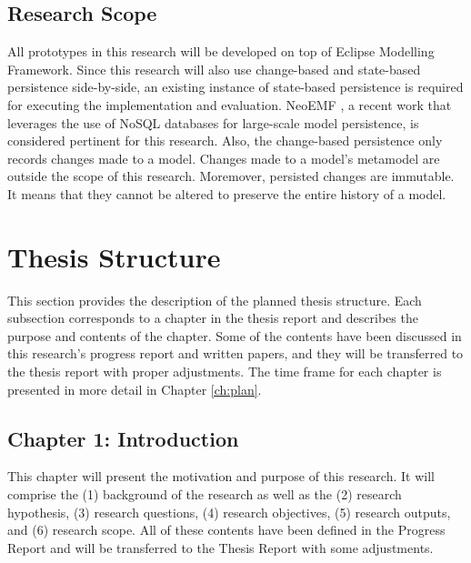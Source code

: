 \documentclass[12pt, a4paper]{report} \usepackage[titletoc]{appendix}
\begin{document}
\section{Research Scope}
\label{sec:research_scope}
All prototypes in this research will be developed on top of Eclipse Modelling Framework. Since this research will also use change-based and state-based persistence side-by-side, an existing instance of state-based persistence is required for executing the implementation and evaluation. NeoEMF \cite{daniel2016neoemf}, a recent work that leverages the use of NoSQL databases for large-scale model persistence, is considered pertinent for this research. Also, the change-based persistence only records changes made to a model. Changes made to a model's metamodel are outside the scope of this research. Moremover, persisted changes are immutable. It means that they cannot be altered to preserve the entire history of a model.

\chapter{Thesis Structure}
\label{sec:Thesis Structure}
This section provides the description of the planned thesis structure. Each subsection corresponds to a chapter in the thesis report and describes the purpose and contents of the chapter. Some of the contents have been discussed in this research's progress report and written papers, and they will be transferred to the thesis report with proper adjustments. The time frame for each chapter is presented in more detail in Chapter \ref{ch:plan}.

\section{Chapter 1: Introduction}
\label{sec:chapter_1_introduction_plan}
This chapter will present the motivation and purpose of this research. It will comprise the (1) background of the research as well as the (2) research hypothesis, (3) research questions, (4) research objectives, (5) research outputs, and (6) research scope. All of these contents have been defined in the Progress Report and will be transferred to the Thesis Report with some adjustments. 
\end{document}

